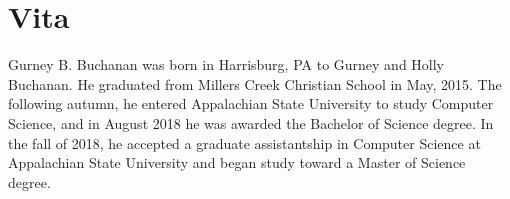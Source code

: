 \chapter*{Vita}

Gurney B. Buchanan was born in Harrisburg, PA to Gurney and Holly Buchanan.  He graduated from Millers Creek Christian School in May, 2015.  The following autumn, he entered Appalachian State University to study Computer Science, and in August 2018 he was awarded the Bachelor of Science degree.  In the fall of 2018, he accepted a graduate assistantship in Computer Science at Appalachian State University and began study toward a Master of Science degree.  
